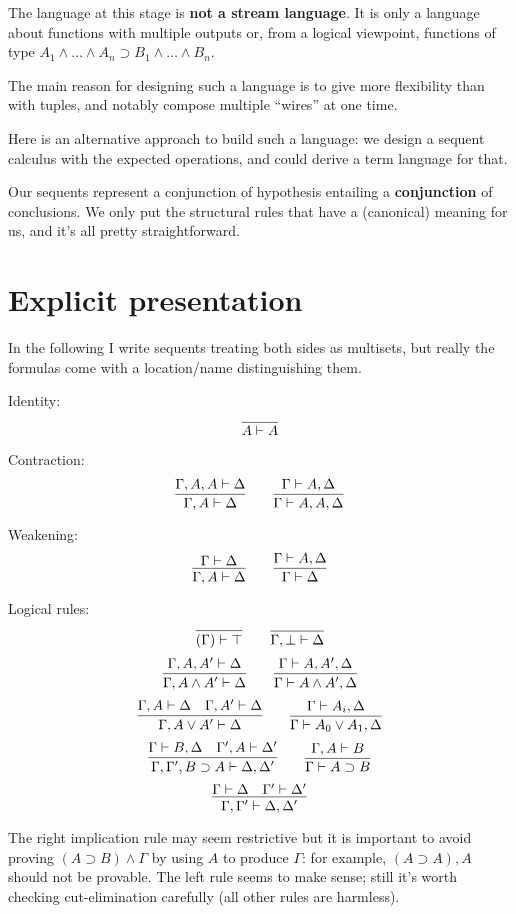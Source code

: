 \documentclass{article}
\renewcommand{\|}{\; | \;}
\begin{document}
The language at this stage is \textbf{not a stream language}.
It is only a language about functions with multiple outputs
or, from a logical viewpoint, functions of type
$A_1 \wedge \ldots \wedge A_n \supset B_1 \wedge \ldots \wedge B_n$.

The main reason for designing such a language is to give more
flexibility than with tuples, and notably compose multiple ``wires''
at one time.

Here is an alternative approach to build such a language:
we design a sequent calculus with the expected operations,
and could derive a term language for that.

Our sequents represent a conjunction of hypothesis entailing
a \textbf{conjunction} of conclusions. We only put the structural
rules that have a (canonical) meaning for us, and it's all pretty
straightforward.

\section{Explicit presentation}

In the following I write sequents treating both sides as multisets,
but really the formulas come with a location/name distinguishing them.

Identity:
\[ \infer{A\vdash A}{} \]

Contraction:
\[ \infer{\Gamma,A\vdash \Delta}{\Gamma,A,A\vdash \Delta}
\quad\quad
   \infer{\Gamma\vdash A,A,\Delta}{\Gamma\vdash A,\Delta} \]

Weakening:
\[ \infer{\Gamma,A\vdash\Delta}{\Gamma\vdash\Delta}
\quad\quad
   \infer{\Gamma\vdash \Delta}{\Gamma\vdash A,\Delta} \]

Logical rules:
\[ \infer{(\Gamma)\vdash\top}{} \quad\quad \infer{\Gamma,\bot\vdash\Delta}{} \]
\[ \infer{\Gamma,A\wedge A'\vdash \Delta}{\Gamma,A,A'\vdash \Delta}
\quad\quad
   \infer{\Gamma\vdash A\wedge A',\Delta}{\Gamma\vdash A,A',\Delta} \]
\[ \infer{\Gamma,A\vee A' \vdash \Delta}{\Gamma,A\vdash \Delta &
                                         \Gamma,A'\vdash \Delta}
\quad\quad
   \infer{\Gamma \vdash A_0\vee A_1,\Delta}{\Gamma\vdash A_i,\Delta} \]
\[ \infer{\Gamma,\Gamma',B\supset A\vdash \Delta,\Delta'}{
      \Gamma\vdash B,\Delta & \Gamma',A\vdash \Delta'}
\quad\quad
   \infer{\Gamma\vdash A\supset B}{\Gamma,A\vdash B} \]
\[ \infer{\Gamma,\Gamma'\vdash \Delta,\Delta'}{
      \Gamma\vdash\Delta & \Gamma'\vdash\Delta'} \]

The right implication rule may seem restrictive but it is important to avoid
proving $(A\supset B)\wedge \Gamma$ by using $A$ to produce $\Gamma$:
for example, $(A\supset A),A$ should not be provable.
The left rule seems to make sense; still it's worth checking cut-elimination
carefully (all other rules are harmless).
\end{document}
